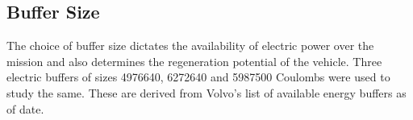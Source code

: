 \documentclass{article}
\begin{document}
\subsection{Buffer Size}

The choice of buffer size dictates the availability of electric power over the mission and also determines the regeneration potential of the vehicle. Three electric buffers of sizes 4976640, 6272640 and 5987500 Coulombs were used to study the same. These are derived from Volvo's list of available energy buffers as of date.
\end{document}
